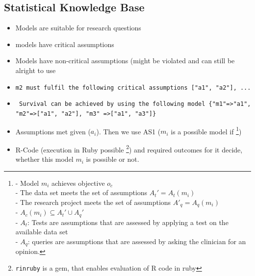 \subsection{Statistical Knowledge Base}
\begin{itemize}
	\item Models are suitable for research questions
	\item models have critical assumptions
	\item Models have non-critical assumptions (might be violated and can still be alright to use
	\item \texttt{m2 must fulfil the following critical assumptions ["a1", "a2"], ... }
	\item \texttt{ Survival can be achieved by using the following model \{"m1"=>"a1", "m2"=>["a1", "a2"], "m3" =>["a1", "a3"]\}}
	\item Assumptions met given ($a_i$). Then we use AS1 ($m_i$ is a possible model if 
			\footnote{
				- Model $m_i$ achieves objective $o_c$\\
				- The data set meets the set of assumptions $A_t' = A_t (m_i)$\\
				- The research project meets the set of assumptions $A'_q = A_q (m_i)$\\
				- $A_c(m_i) \subseteq A_t' \cup A_q'$\\
				- $A_t$: Tests are assumptions that are assessed by applying a test on the available data set \\
				- $A_q$: queries are assumptions that are assessed by asking the clinician for an opinion.
			})
	\item R-Code (execution in Ruby possible \cite{rinRuby}   \footnote{\texttt{rinruby} is a gem, that enables evaluation of R code in ruby}) and required outcomes for it decide, whether this model $m_i$ is possible or not. 
\end{itemize}

